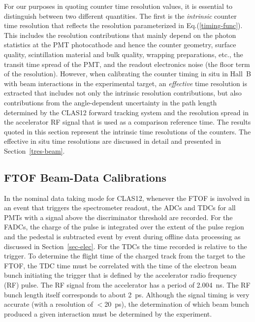 \documentclass{elsart}
\begin{document}
For our purposes in quoting counter time resolution values, it is essential to distinguish between two
different quantities. The first is the {\em intrinsic} counter time resolution that reflects the resolution
parameterized in Eq.(\ref{timing-func}). This includes the resolution contributions that mainly depend on
the photon statistics at the PMT photocathode and hence the counter geometry, surface quality, scintillation
material and bulk quality, wrapping preparations, etc., the transit time spread of the PMT, and the readout
electronics noise (the floor term of the resolution). However, when calibrating the counter timing in situ in
Hall~B with beam interactions in the experimental target, an {\em effective} time resolution is extracted that
includes not only the intrinsic resolution contributions, but also contributions from the angle-dependent
uncertainty in the path length determined by the CLAS12 forward tracking system and the resolution spread
in the accelerator RF signal that is used as a comparison reference time. The results quoted in this section
represent the intrinsic time resolutions of the counters. The effective in situ time resolutions are discussed
in detail and presented in Section~\ref{tres-beam}.

\subsection{FTOF Beam-Data Calibrations}
\label{beam-data-calib}

In the nominal data taking mode for CLAS12, whenever the FTOF is involved in an event that triggers the
spectrometer readout, the ADCs and TDCs for all PMTs with a signal above the discriminator threshold are
recorded. For the FADCs, the charge of the pulse is integrated over the extent of the pulse region and the
pedestal is subtracted event by event during offline data processing as discussed in Section~\ref{sec-elec}.
For the TDCs the time recorded is relative to the trigger. To determine the flight time of the charged track
from the target to the FTOF, the TDC time must be correlated with the time of the electron beam bunch
initiating the trigger that is defined by the accelerator radio frequency (RF) pulse. The RF signal from the
accelerator has a period of 2.004~ns. The RF bunch length itself corresponds to about 2~ps. Although
the signal timing is very accurate (with a resolution of $<$20~ps), the determination of which beam bunch
produced a given interaction must be determined by the experiment.
\end{document}
